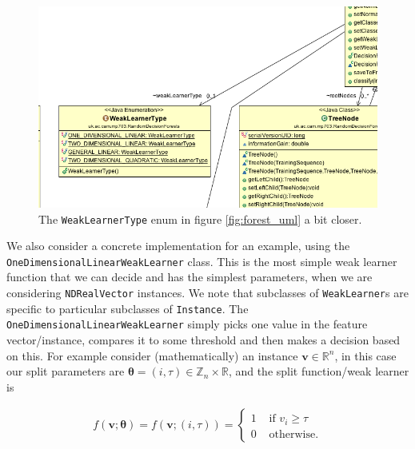 \documentclass[12pt,twoside,notitlepage]{report}
\newcommand{\vc}[1]{\mathbf{#1}}
\newcommand{\bb}[1]{\mathbb{#1}}
\begin{document}
                \begin{figure}[H]
                    \centering
                    \includegraphics[scale=0.5]{WeakLearnerType_Forest_UML}
                    \caption{The \texttt{WeakLearnerType} enum in figure \ref{fig:forest_uml} a bit closer.}
                    \label{fig:weak_learner_type_uml}
                \end{figure}

                We also consider a concrete implementation for an example, using the \texttt{OneDimensionalLinearWeakLearner} 
                class. This is the most simple weak learner function that we can decide and has the simplest parameters, 
                when we are considering \texttt{NDRealVector} instances. We note that subclasses of \texttt{WeakLearner}s are
                specific to particular subclasses of \texttt{Instance}. 
                The \texttt{OneDimensionalLinearWeakLearner} simply picks one value in the feature vector/instance, compares 
                it to some threshold and then makes a decision based on this. For example consider (mathematically) an 
                instance $\vc{v} \in \bb{R}^n$, in this case our split parameters are $\vc{\theta} = (i,\tau) \in 
                \bb{Z}_n \times \bb{R}$, and the split function/weak learner is

                \begin{align}
                  f(\vc{v}; \vc{\theta}) = f(\vc{v}; (i,\tau)) = \begin{cases}
                    1 & \text{ if } v_i \geq \tau \\
                    0 & \text{ otherwise.}
                  \end{cases}
                  \label{eq:split_equation}
                \end{align}
\end{document}

